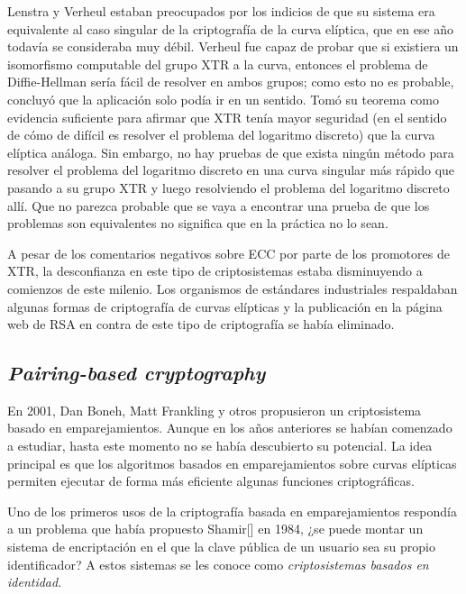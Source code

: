 \documentclass[
  a4paper,
  12pt,
  spanish,
]{scrartcl}
\begin{document}
Lenstra y Verheul estaban preocupados por los indicios de que su sistema era equivalente al caso singular de la criptografía de la curva elíptica, que en ese año todavía se consideraba muy débil. Verheul fue capaz de probar que si existiera un isomorfismo computable del grupo XTR a la curva, entonces el problema de Diffie-Hellman sería fácil de resolver en ambos grupos; como esto no es probable, concluyó que la aplicación solo podía ir en un sentido. Tomó su teorema como evidencia suficiente para afirmar que XTR tenía mayor seguridad (en el sentido de cómo de difícil es resolver el problema del logaritmo discreto) que la curva elíptica análoga. Sin embargo, no hay pruebas de que exista ningún método para resolver el problema del logaritmo discreto  en una curva singular más rápido que pasando a su grupo XTR y luego resolviendo el problema del logaritmo discreto allí. Que no parezca probable que se vaya a encontrar una prueba de que los problemas son equivalentes no significa que en la práctica no lo sean.

A pesar de los comentarios negativos sobre ECC por parte de los promotores de XTR, la desconfianza en este tipo de criptosistemas estaba disminuyendo a comienzos de este milenio. Los organismos de estándares industriales respaldaban algunas formas de criptografía de curvas elípticas y la publicación en la página web de RSA en contra de este tipo de criptografía se había eliminado.

\subsection{\textit{Pairing-based cryptography}}
En 2001, Dan Boneh, Matt Frankling y otros propusieron un criptosistema basado en emparejamientos. Aunque en los años anteriores se habían comenzado a estudiar, hasta este momento no se había descubierto su potencial. La idea principal es que los algoritmos basados en emparejamientos sobre curvas elípticas permiten ejecutar de forma más eficiente algunas funciones criptográficas.

Uno de los primeros usos de la criptografía basada en emparejamientos respondía a un problema que había propuesto Shamir[] en 1984, ¿se puede montar un sistema de encriptación en el que la clave pública de un usuario sea su propio identificador? A estos sistemas se les conoce como \textit{criptosistemas basados en identidad}.
\end{document}
